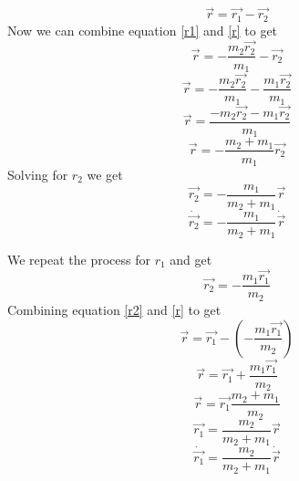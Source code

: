 \documentclass[11pt]{article}
\numberwithin{equation}{section}
\begin{document}
\begin{enumerate}[(a)]
\begin{equation}
\vec{r} = \vec{r_1} - \vec{r_2}
\label{r}
\end{equation}
Now we can combine equation \ref{r1} and \ref{r} to get
$$\vec{r} = - \frac{m_2\vec{r_2}}{m_1} - \vec{r_2}$$
$$\vec{r} = - \frac{m_2\vec{r_2}}{m_1} - \frac{m_1\vec{r_2}}{m_1}$$
$$\vec{r} =  \frac{-m_2\vec{r_2} - m_1\vec{r_2}}{m_1}$$
$$\vec{r} =  -\frac{m_2 + m_1}{m_1}\vec{r_2}$$
Solving for $r_2$ we get 
$$\vec{r_2} =  -\frac{m_1}{m_2 + m_1}\vec{r}$$
$$\dot{\vec{r_2}} =  -\frac{m_1}{m_2 + m_1}\dot{\vec{r}}$$

We repeat the process for $r_1$ and get 
\begin{equation}
\vec{r_2} = - \frac{m_1\vec{r_1}}{m_2}
\label{r2}
\end{equation}
Combining equation \ref{r2} and \ref{r} to get
$$\vec{r} = \vec{r_1} -\left( - \frac{m_1\vec{r_1}}{m_2}\right)$$
$$\vec{r} = \vec{r_1} + \frac{m_1\vec{r_1}}{m_2}$$
$$\vec{r} = \vec{r_1}\frac{m_2+m_1}{m_2}$$
$$\vec{r_1} = \frac{m_2}{m_2+m_1}\vec{r}$$
$$\dot\vec{r_1} = \frac{m_2}{m_2+m_1}\dot{\vec{r}}$$


\end{enumerate}
\end{document}
